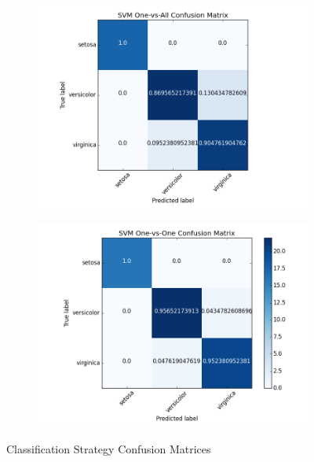 \documentclass[11pt]{article}
\begin{document}
\begin{figure}[H]
\centering
\hspace*{-2cm} 
\begin{subfigure}{.5\textwidth}
  \centering
  \includegraphics[width=1.2\linewidth]{svm_linear_1va_cm.png}
   \label{fig:sub1}
\end{subfigure}%
\begin{subfigure}{.5\textwidth}
  \centering
  \includegraphics[width=1.2\linewidth]{svm_linear_1v1_cm.png}
   \label{fig:sub2}
\end{subfigure}
\caption{Classification Strategy Confusion Matrices}
\label{fig:svm_cm}
\end{figure}
\end{document}
